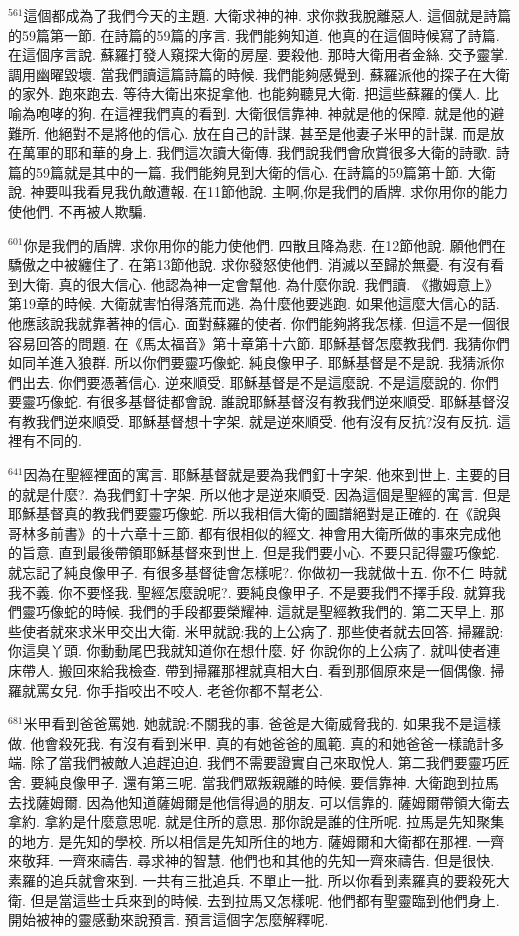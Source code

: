 \documentclass{book}
\begin{document}
$^{561}$這個都成為了我們今天的主題.
大衛求神的神.
求你救我脫離惡人.
這個就是詩篇的59篇第一節.
在詩篇的59篇的序言.
我們能夠知道.
他真的在這個時候寫了詩篇.
在這個序言說.
蘇羅打發人窺探大衛的房屋.
要殺他.
那時大衛用者金絲.
交予靈掌.
調用幽曜毀壞.
當我們讀這篇詩篇的時候.
我們能夠感覺到.
蘇羅派他的探子在大衛的家外.
跑來跑去.
等待大衛出來捉拿他.
也能夠聽見大衛.
把這些蘇羅的僕人.
比喻為咆哮的狗.
在這裡我們真的看到.
大衛很信靠神.
神就是他的保障.
就是他的避難所.
他絕對不是將他的信心.
放在自己的計謀.
甚至是他妻子米甲的計謀.
而是放在萬軍的耶和華的身上.
我們這次讀大衛傳.
我們說我們會欣賞很多大衛的詩歌.
詩篇的59篇就是其中的一篇.
我們能夠見到大衛的信心.
在詩篇的59篇第十節.
大衛說.
神要叫我看見我仇敵遭報.
在11節他說.
主啊,你是我們的盾牌.
求你用你的能力使他們.
不再被人欺騙.

$^{601}$你是我們的盾牌.
求你用你的能力使他們.
四散且降為悲.
在12節他說.
願他們在驕傲之中被纏住了.
在第13節他說.
求你發怒使他們.
消滅以至歸於無憂.
有沒有看到大衛.
真的很大信心.
他認為神一定會幫他.
為什麼你說.
我們讀.
《撒姆意上》第19章的時候.
大衛就害怕得落荒而逃.
為什麼他要逃跑.
如果他這麼大信心的話.
他應該說我就靠著神的信心.
面對蘇羅的使者.
你們能夠將我怎樣.
但這不是一個很容易回答的問題.
在《馬太福音》第十章第十六節.
耶穌基督怎麼教我們.
我猜你們如同羊進入狼群.
所以你們要靈巧像蛇.
純良像甲子.
耶穌基督是不是說.
我猜派你們出去.
你們要憑著信心.
逆來順受.
耶穌基督是不是這麼說.
不是這麼說的.
你們要靈巧像蛇.
有很多基督徒都會說.
誰說耶穌基督沒有教我們逆來順受.
耶穌基督沒有教我們逆來順受.
耶穌基督想十字架.
就是逆來順受.
他有沒有反抗?沒有反抗.
這裡有不同的.

$^{641}$因為在聖經裡面的寓言.
耶穌基督就是要為我們釘十字架.
他來到世上.
主要的目的就是什麼?.
為我們釘十字架.
所以他才是逆來順受.
因為這個是聖經的寓言.
但是耶穌基督真的教我們要靈巧像蛇.
所以我相信大衛的圖譜絕對是正確的.
在《說與哥林多前書》的十六章十三節.
都有很相似的經文.
神會用大衛所做的事來完成他的旨意.
直到最後帶領耶穌基督來到世上.
但是我們要小心.
不要只記得靈巧像蛇.
就忘記了純良像甲子.
有很多基督徒會怎樣呢?.
你做初一我就做十五.
你不仁 時就我不義.
你不要怪我.
聖經怎麼說呢?.
要純良像甲子.
不是要我們不擇手段.
就算我們靈巧像蛇的時候.
我們的手段都要榮耀神.
這就是聖經教我們的.
第二天早上.
那些使者就來求米甲交出大衛.
米甲就說:我的上公病了.
那些使者就去回答.
掃羅說:你這臭丫頭.
你動動尾巴我就知道你在想什麼.
好 你說你的上公病了.
就叫使者連床帶人.
搬回來給我檢查.
帶到掃羅那裡就真相大白.
看到那個原來是一個偶像.
掃羅就罵女兒.
你手指咬出不咬人.
老爸你都不幫老公.

$^{681}$米甲看到爸爸罵她.
她就說:不關我的事.
爸爸是大衛威脅我的.
如果我不是這樣做.
他會殺死我.
有沒有看到米甲.
真的有她爸爸的風範.
真的和她爸爸一樣詭計多端.
除了當我們被敵人追趕迫迫.
我們不需要證實自己來取悅人.
第二我們要靈巧匠舍.
要純良像甲子.
還有第三呢.
當我們眾叛親離的時候.
要信靠神.
大衛跑到拉馬去找薩姆爾.
因為他知道薩姆爾是他信得過的朋友.
可以信靠的.
薩姆爾帶領大衛去拿約.
拿約是什麼意思呢.
就是住所的意思.
那你說是誰的住所呢.
拉馬是先知聚集的地方.
是先知的學校.
所以相信是先知所住的地方.
薩姆爾和大衛都在那裡.
一齊來敬拜.
一齊來禱告.
尋求神的智慧.
他們也和其他的先知一齊來禱告.
但是很快.
素羅的追兵就會來到.
一共有三批追兵.
不單止一批.
所以你看到素羅真的要殺死大衛.
但是當這些士兵來到的時候.
去到拉馬又怎樣呢.
他們都有聖靈臨到他們身上.
開始被神的靈感動來說預言.
預言這個字怎麼解釋呢.
\end{document}
